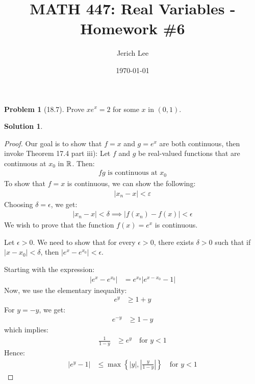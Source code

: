 \documentclass[12pt]{article}
\title{MATH 447: Real Variables - Homework \#6}
\author{Jerich Lee}
\date{\today}
\theoremstyle{definition} %
\newtheorem{solution}{Solution}
\newtheorem{problem}{Problem}
\theoremstyle{plain} %
\begin{document}
\maketitle
\begin{problem}[18.7]
  Prove $xe^{x} =2$ for some $x$ in $(0,1)$.  
\end{problem}
\begin{solution}
  \begin{proof}
    Our goal is to show that $f=x$ and $g=e^{x}$ are both continuous, then invoke Theorem 17.4 part iii): Let $f$ and $g$ be real-valued functions that are continuous at $x_0$ in $\mathbb{\MakeUppercase{r}} $. Then: 
    \begin{align}
     fg \text{ is continuous at } x_0 
    \end{align}
    To show that $f=x$ is continuous, we can show the following:
    \begin{align}
     \left\vert x_n -x\right\vert <\varepsilon
    \end{align}
    Choosing $\delta =\epsilon $, we get:
    \begin{align}
     \left\vert x_{n} -x \right\vert <\delta \implies \left\vert f(x_n)-f(x) \right\vert <\epsilon
    \end{align} 
    We wish to prove that the function $ f(x) = e^x $ is continuous.
  
    Let $ \epsilon > 0 $. We need to show that for every $ \epsilon > 0 $, there exists $ \delta > 0 $ such that if $ |x - x_0| < \delta $, then $ |e^x - e^{x_0}| < \epsilon $.
    
    Starting with the expression:
    \begin{align}
    |e^x - e^{x_0}| &= e^{x_0} |e^{x - x_0} - 1|
    \end{align}
    Now, we use the elementary inequality:
    \begin{align}
    e^y &\geq 1 + y
    \end{align}
    For $ y = -y $, we get:
    \begin{align}
    e^{-y} &\geq 1 - y
    \end{align}
    which implies:
    \begin{align}
    \frac{1}{1 - y} &\geq e^y \quad \text{for } y < 1
    \end{align}
    Hence:
    \begin{align}
    |e^y - 1| &\leq \max \left\{ |y|, \left| \frac{y}{1 - y} \right| \right\} \quad \text{for } y < 1
    \end{align}
    

\end{proof}
\end{solution}
\end{document}
